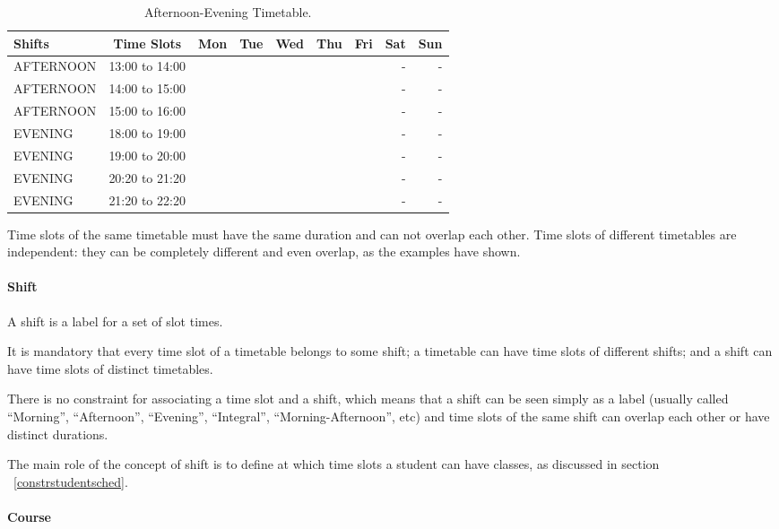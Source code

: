 \begin{table}[H]
\centering
\begin{tabular}{l|c|r|r|r|r|r|r|r}
Shifts & Time Slots & Mon & Tue & Wed & Thu & Fri & Sat & Sun \\\hline
AFTERNOON & 13:00 to 14:00 & & & & & & - & - \\
AFTERNOON & 14:00 to 15:00 & & & & & & - & - \\
AFTERNOON & 15:00 to 16:00 & & & & & & - & - \\
EVENING & 18:00 to 19:00 & & & & & & - & - \\
EVENING & 19:00 to 20:00 & & & & & & - & - \\
EVENING & 20:20 to 21:20 & & & & & & - & - \\
EVENING & 21:20 to 22:20 & & & & & & - & -
\end{tabular}
\caption{\label{tab:calendarioTN}Afternoon-Evening Timetable.}
\end{table}


Time slots of the same timetable must have the same duration and can not overlap each other. Time slots of different timetables are independent: they can be completely different and even overlap, as the examples have shown.


\paragraph{Shift}
\label{defshift}

A shift is a label for a set of slot times.

It is mandatory that every time slot of a timetable belongs to some shift; a timetable can have time slots of different shifts; and a shift can have time slots of distinct timetables.

There is no constraint for associating a time slot and a shift, which means that a shift can be seen simply as a label (usually called ``Morning'', ``Afternoon'', ``Evening'', ``Integral'', ``Morning-Afternoon'', etc) and time slots of the same shift can overlap each other or have distinct durations.

The main role of the concept of shift is to define at which time slots a student can have classes, as discussed in section ~\ref{constrstudentsched}.


\paragraph{Course}
\label{defcourse}

